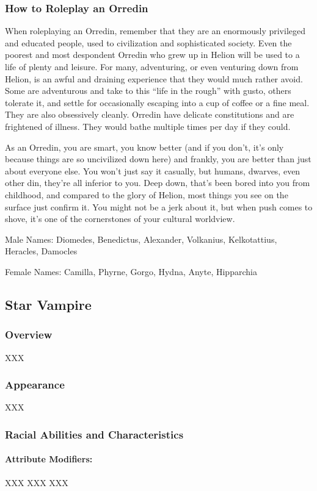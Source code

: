 \documentclass[oneside,11pt,english]{book}
\begin{document}
\subsubsection{How to Roleplay an Orredin}
When roleplaying an Orredin, remember that they are an enormously privileged and educated people, 
used to civilization and sophisticated society. Even the poorest and most despondent Orredin who grew 
up in Helion will be used to a life of plenty and leisure. For many, adventuring, or even venturing down 
from Helion, is an awful and draining experience that they would much rather avoid. Some are 
adventurous and take to this “life in the rough” with gusto, others tolerate it, and settle for occasionally 
escaping into a cup of coffee or a fine meal. 
They are also obsessively cleanly. Orredin have delicate constitutions and are frightened of illness. They 
would bathe multiple times per day if they could. 


As an Orredin, you are smart, you know better (and if you don’t, it’s only because things are so 
uncivilized down here) and frankly, you are better than just about everyone else. You won’t just say it 
casually, but humans, dwarves, even other din, they’re all inferior to you. Deep down, that’s been bored 
into you from childhood, and compared to the glory of Helion, most things you see on the surface just 
confirm it. You might not be a jerk about it, but when push comes to shove, it’s one of the cornerstones of 
your cultural worldview. 


Male Names: Diomedes, Benedictus, Alexander, Volkanius, Kelkotattius, Heracles, Damocles 

Female Names: Camilla, Phyrne, Gorgo, Hydna, Anyte, Hipparchia 
\subsection{Star Vampire}
\subsubsection*{Overview} 
XXX 
\subsubsection*{Appearance} 
XXX 
\subsubsection*{Racial Abilities and Characteristics} 
\paragraph{Attribute Modifiers:} XXX
XXX 
XXX 
\end{document}
